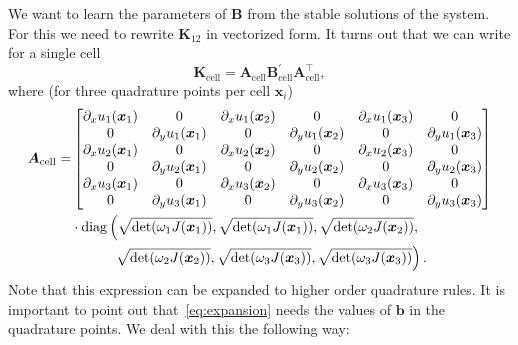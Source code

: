 \documentclass[aps,pre]{revtex4-2}
\DeclareMathOperator{\diag}{diag}
\begin{document}
We want to learn the parameters of $\bm{B}$ from the stable solutions of the system.
For this we need to rewrite $\bm{K}_{12}$ in vectorized form.
It turns out that we can write for a single cell
\begin{equation}\label{eq:decomposition}
    \bm{K}_\mathrm{cell} = \bm{A}_\mathrm{cell}\bm{B}^\prime_\mathrm{cell}\bm{A}^\top_\mathrm{cell},
\end{equation}
where (for three quadrature points per cell $\bm{x}_i$)
\begin{equation}
	\begin{split}
        \bm{A}_\mathrm{cell} =&
		\begin{bmatrix}
			\partial_x u_1(\bm{x}_1) & 0                        & \partial_x u_1(\bm{x}_2) & 0                        & \partial_x u_1(\bm{x}_3) & 0                        \\
			0                        & \partial_y u_1(\bm{x}_1) & 0                        & \partial_y u_1(\bm{x}_2) & 0                        & \partial_y u_1(\bm{x}_3) \\
			\partial_x u_2(\bm{x}_1) & 0                        & \partial_x u_2(\bm{x}_2) & 0                        & \partial_x u_2(\bm{x}_3) & 0                        \\
			0                        & \partial_y u_2(\bm{x}_1) & 0                        & \partial_y u_2(\bm{x}_2) & 0                        & \partial_y u_2(\bm{x}_3) \\
			\partial_x u_3(\bm{x}_1) & 0                        & \partial_x u_3(\bm{x}_2) & 0                        & \partial_x u_3(\bm{x}_3) & 0                        \\
			0                        & \partial_y u_3(\bm{x}_1) & 0                        & \partial_y u_3(\bm{x}_2) & 0                        & \partial_y u_3(\bm{x}_3)
		\end{bmatrix}\\
		&\cdot\diag\left(\sqrt{\det(\omega_1J(\bm{x}_1))},\sqrt{\det(\omega_1J(\bm{x}_1))},\sqrt{\det(\omega_2J(\bm{x}_2))},\right.\\
		&\left.\hphantom{\cdot\diag\big(}\sqrt{\det(\omega_2J(\bm{x}_2))},\sqrt{\det(\omega_3J(\bm{x}_3))},\sqrt{\det(\omega_3J(\bm{x}_3))} \right).
	\end{split}
\end{equation}
Note that this expression can be expanded to higher order quadrature rules.
It is important to point out that~\eqref{eq:expansion} needs the values of $\bm{b}$ in the quadrature points.
We deal with this the following way:
\end{document}
